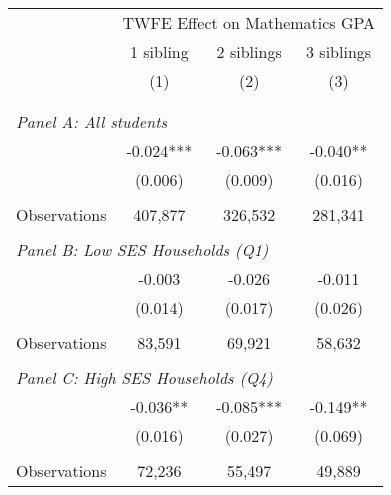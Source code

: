 \makeatletter
{}
{
\makeatother
\begin{tabular}{lccc}
\toprule
\cmidrule(lr){2-4}
& \multicolumn{3}{c}{TWFE Effect on Mathematics GPA} \\
\cmidrule(lr){2-4}
& 1 sibling & 2 siblings & 3 siblings  \\
\cmidrule(lr){2-2} \cmidrule(lr){3-3} \cmidrule(lr){4-4}
& (1) & (2) & (3)\\
\bottomrule
&  &  &  \\
&  &  &   \\
\multicolumn{4}{l}{\textit{Panel A: All students}} \\
\hspace{3mm}        &      -0.024***&      -0.063***&      -0.040** \\
                    &     (0.006)   &     (0.009)   &     (0.016)   \\
                    &               &               &               \\
\hspace{3mm}Observations&     407,877   &     326,532   &     281,341   \\
 
&  &  &   \\
\multicolumn{4}{l}{\textit{Panel B: Low SES Households (Q1)}} \\
\hspace{3mm}        &      -0.003   &      -0.026   &      -0.011   \\
                    &     (0.014)   &     (0.017)   &     (0.026)   \\
                    &               &               &               \\
\hspace{3mm}Observations&      83,591   &      69,921   &      58,632   \\
 
&  &  &   \\
\multicolumn{4}{l}{\textit{Panel C: High SES Households (Q4)}} \\
\hspace{3mm}        &      -0.036** &      -0.085***&      -0.149** \\
                    &     (0.016)   &     (0.027)   &     (0.069)   \\
                    &               &               &               \\
\hspace{3mm}Observations&      72,236   &      55,497   &      49,889   \\
 

\end{tabular}}
